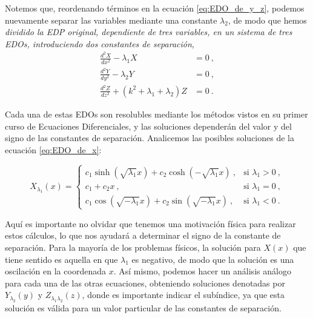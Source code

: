 Notemos que, reordenando términos en la ecuación \eqref{eq:EDO_de_y_z}, podemos nuevamente separar las variables mediante una constante $\lambda_2$, de modo que hemos \emph{dividido la EDP original, dependiente de tres variables, en un sistema de tres EDOs, introduciendo dos constantes de separación},
\begin{align}
    \frac{d^2X}{dx^2} - \lambda_1 X & = 0 \ , \label{eq:EDO_de_x}  \\
    \frac{d^2Y}{dy^2} - \lambda_2 Y & = 0 \ , \label{eq:EDO_de_y}  \\
    \frac{d^2Z}{dz^2} + (k^2 + \lambda_1 + \lambda_2) Z & = 0 \ . \label{eq:EDO_de_z} 
\end{align}

Cada una de estas EDOs son resolubles mediante los métodos vistos en su primer curso de Ecuaciones Diferenciales, y las soluciones dependerán del valor y del signo de las constantes de separación. Analicemos las posibles soluciones de la ecuación \eqref{eq:EDO_de_x}:

\begin{equation}
    X_{\lambda_1}(x) = \left\{
    \begin{array}{cc} 
            c_1 \sinh(\sqrt{\lambda_1} x) + c_2 \cosh(-\sqrt{\lambda_1}x) \ , & \text{si } \lambda_1 > 0 \ , \\
            c_1 + c_2 x \ , & \text{si } \lambda_1 = 0 \ , \\
            c_1 \cos(\sqrt{-\lambda_1}x) + c_2 \sin(\sqrt{-\lambda_1}x) \ , & \text{si } \lambda_1 < 0 \ .
    \end{array}
    \right.
\end{equation}

Aquí es importante no olvidar que tenemos una motivación física para realizar estos cálculos, lo que nos ayudará a determinar el signo de la constante de separación. Para la mayoría de los problemas físicos, la solución para $X(x)$ que tiene sentido es aquella en que $\lambda_1$ es negativo, de modo que la solución es una oscilación en la coordenada $x$. Así mismo, podemos hacer un análisis análogo para cada una de las otras ecuaciones, obteniendo soluciones denotadas por $Y_{\lambda_2}(y)$ y $Z_{\lambda_1 \lambda_2}(z)$, donde es importante indicar el subíndice, ya que esta solución es válida para un valor particular de las constantes de separación.

